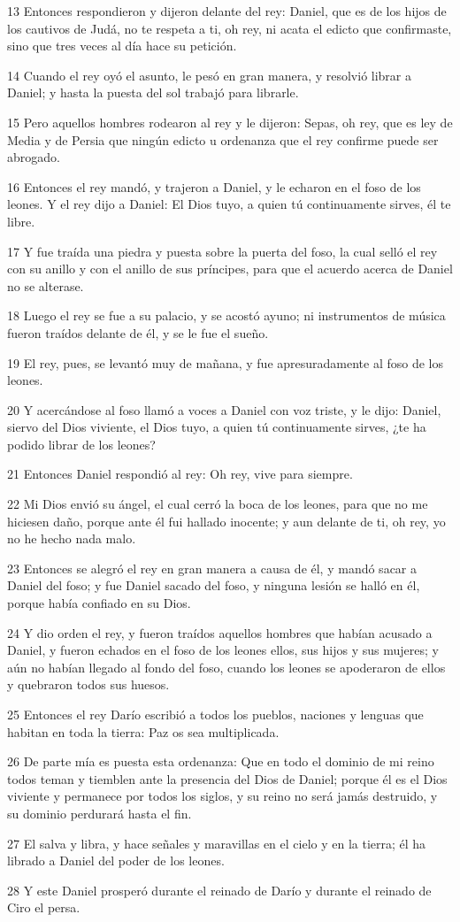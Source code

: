 \par 13 Entonces respondieron y dijeron delante del rey: Daniel, que es de los hijos de los cautivos de Judá, no te respeta a ti, oh rey, ni acata el edicto que confirmaste, sino que tres veces al día hace su petición.
\par 14 Cuando el rey oyó el asunto, le pesó en gran manera, y resolvió librar a Daniel; y hasta la puesta del sol trabajó para librarle.
\par 15 Pero aquellos hombres rodearon al rey y le dijeron: Sepas, oh rey, que es ley de Media y de Persia que ningún edicto u ordenanza que el rey confirme puede ser abrogado.
\par 16 Entonces el rey mandó, y trajeron a Daniel, y le echaron en el foso de los leones. Y el rey dijo a Daniel: El Dios tuyo, a quien tú continuamente sirves, él te libre.
\par 17 Y fue traída una piedra y puesta sobre la puerta del foso, la cual selló el rey con su anillo y con el anillo de sus príncipes, para que el acuerdo acerca de Daniel no se alterase.
\par 18 Luego el rey se fue a su palacio, y se acostó ayuno; ni instrumentos de música fueron traídos delante de él, y se le fue el sueño.
\par 19 El rey, pues, se levantó muy de mañana, y fue apresuradamente al foso de los leones.
\par 20 Y acercándose al foso llamó a voces a Daniel con voz triste, y le dijo: Daniel, siervo del Dios viviente, el Dios tuyo, a quien tú continuamente sirves, ¿te ha podido librar de los leones?
\par 21 Entonces Daniel respondió al rey: Oh rey, vive para siempre.
\par 22 Mi Dios envió su ángel, el cual cerró la boca de los leones, para que no me hiciesen daño, porque ante él fui hallado inocente; y aun delante de ti, oh rey, yo no he hecho nada malo.
\par 23 Entonces se alegró el rey en gran manera a causa de él, y mandó sacar a Daniel del foso; y fue Daniel sacado del foso, y ninguna lesión se halló en él, porque había confiado en su Dios.
\par 24 Y dio orden el rey, y fueron traídos aquellos hombres que habían acusado a Daniel, y fueron echados en el foso de los leones ellos, sus hijos y sus mujeres; y aún no habían llegado al fondo del foso, cuando los leones se apoderaron de ellos y quebraron todos sus huesos.
\par 25 Entonces el rey Darío escribió a todos los pueblos, naciones y lenguas que habitan en toda la tierra: Paz os sea multiplicada.
\par 26 De parte mía es puesta esta ordenanza: Que en todo el dominio de mi reino todos teman y tiemblen ante la presencia del Dios de Daniel; porque él es el Dios viviente y permanece por todos los siglos, y su reino no será jamás destruido, y su dominio perdurará hasta el fin.
\par 27 El salva y libra, y hace señales y maravillas en el cielo y en la tierra; él ha librado a Daniel del poder de los leones.
\par 28 Y este Daniel prosperó durante el reinado de Darío y durante el reinado de Ciro el persa.

